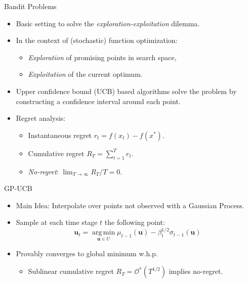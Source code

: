 \documentclass[handout]{beamer}
\newcommand{\sysInput}{\mathbf{u}} %
\begin{document}
%
\begin{frame}{Bandit Problems}
\begin{itemize}
\item Basic setting to solve the \emph{exploration-exploitation} dilemma. \pause
\item In the context of (stochastic) function optimization: \pause
	\begin{itemize}
	\item \emph{Exploration} of promising points in search space, \pause
	\item \emph{Exploitation} of the current optimum. \pause
	\end{itemize} 
\item Upper confidence bound (UCB) based algorithms solve the problem by constructing a confidence interval around each point. \pause
\item Regret analysis: \pause
	\begin{itemize}
	\item Instantaneous regret $r_{t} = f(x_{t}) - f(x^{*})$. \pause
	\item Cumulative regret $R_{T} = \sum_{t=1}^{T}r_{t}$. \pause
	\item \emph{No-regret}: $\lim_{T \to \infty}R_{T}/T = 0$.
	\end{itemize}
\end{itemize}
\end{frame}
%
\begin{frame}{GP-UCB}
\begin{itemize}
\item Main Idea: Interpolate over points not observed with a Gaussian Process. \pause
\item Sample at each time stage $t$ the following point: \pause
\begin{equation}
\sysInput_{t} = \operatorname*{arg\,min}_{\sysInput \in U}\mu_{t-1}(\sysInput) - \beta_{t}^{1/2}\sigma_{t-1}(\sysInput) \label{ucb}
\end{equation} \pause
\item Provably converges \cite{Krause1} to global minimum w.h.p. \pause
	\begin{itemize}
	\item Sublinear cumulative regret $R_{T} = \mathcal{O}^{*}(T^{1/2})$ implies no-regret.
	\end{itemize}
\end{itemize}
\end{frame}
\end{document}
